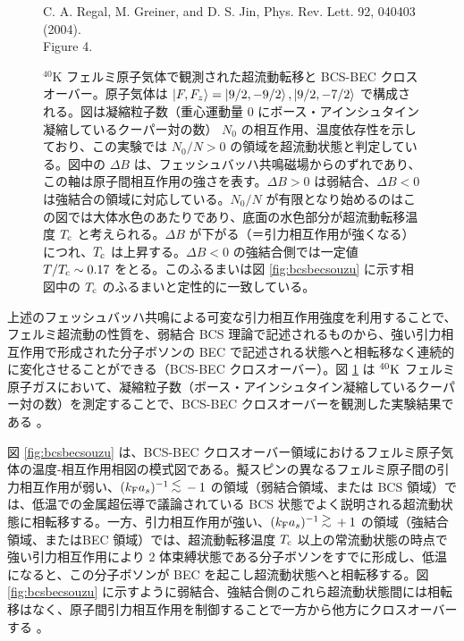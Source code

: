 \begin{figure}[t]
\centering
\vspace{28mm}
C. A. Regal, M. Greiner, and D. S. Jin, Phys. Rev. Lett. 92, 040403 (2004).\\
Figure 4.
\vspace{28mm}
\caption{${}^{40}\mathrm{K}$ フェルミ原子気体で観測された超流動転移と BCS-BEC クロスオーバー\cite{regal2004}。原子気体は $\ket{F, F_z} = \ket{9/2,-9/2}, \ket{9/2, -7/2}$ で構成される。図は凝縮粒子数（重心運動量 0 にボース・アインシュタイン凝縮しているクーパー対の数） $N_0$ の相互作用、温度依存性を示しており、この実験では $N_0/N>0$ の領域を超流動状態と判定している。図中の $\Delta B$ は、フェッシュバッハ共鳴磁場からのずれであり、この軸は原子間相互作用の強さを表す。$\Delta B>0$ は弱結合、$\Delta B<0$ は強結合の領域に対応している。$N_0/N$ が有限となり始めるのはこの図では大体水色のあたりであり、底面の水色部分が超流動転移温度 $T_{\text{c}}$ と考えられる。$\Delta B$ が下がる（＝引力相互作用が強くなる）につれ、$T_{\text{c}}$ は上昇する。$\Delta B <0$ の強結合側では一定値 $T/T_{\text{c}} \sim 0.17$ をとる。このふるまいは図 \ref{fig:bcsbecsouzu} に示す相図中の $T_{\text{c}}$ のふるまいと定性的に一致している。}
\label{fig:bcsbecpota}
\end{figure}


上述のフェッシュバッハ共鳴による可変な引力相互作用強度を利用することで、フェルミ超流動の性質を、弱結合 BCS 理論で記述されるものから、強い引力相互作用で形成された分子ボソンの BEC で記述される状態へと相転移なく連続的に変化させることができる（BCS-BEC クロスオーバー）。図 \ref{fig:bcsbecpota} は ${}^{40}\mathrm{K}$ フェルミ原子ガスにおいて、凝縮粒子数（ボース・アインシュタイン凝縮しているクーパー対の数）を測定することで、BCS-BEC クロスオーバーを観測した実験結果である \cite{regal2004}。

図 \ref{fig:bcsbecsouzu} は、BCS-BEC クロスオーバー領域におけるフェルミ原子気体の温度-相互作用相図の模式図である。擬スピンの異なるフェルミ原子間の引力相互作用が弱い、$\askfi\ltsim -1$ の領域（弱結合領域、または BCS 領域）では、低温での金属超伝導で議論されている BCS 状態でよく説明される超流動状態に相転移する。一方、引力相互作用が強い、$\askfi \gtsim +1$ の領域（強結合領域、またはBEC 領域）では、超流動転移温度 $T_{\text{c}}$ 以上の常流動状態の時点で強い引力相互作用により 2 体束縛状態である分子ボソンをすでに形成し、低温になると、この分子ボソンが BEC を起こし超流動状態へと相転移する。図 \ref{fig:bcsbecsouzu} に示すように弱結合、強結合側のこれら超流動状態間には相転移はなく、原子間引力相互作用を制御することで一方から他方にクロスオーバーする \cite{eagles1969,leggett1980,sademelo1993}。

